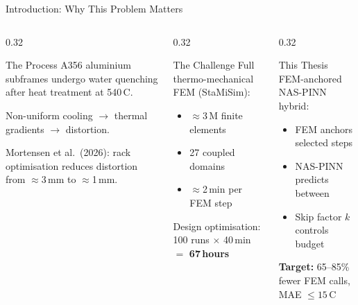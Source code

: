 \documentclass[aspectratio=169, 11pt]{beamer}
\begin{document}
\begin{frame}{Introduction: Why This Problem Matters}
  \begin{columns}[t]
    \begin{column}{0.32\textwidth}
      \begin{block}{The Process}
        \small
        A356 aluminium subframes undergo water quenching after heat
        treatment at 540\,\textdegree C.

        \smallskip
        Non-uniform cooling $\to$ thermal gradients $\to$ distortion.

        \smallskip
        Mortensen et al.\ (2026): rack optimisation reduces distortion
        from $\approx$3\,mm to $\approx$1\,mm.
      \end{block}
    \end{column}
    \begin{column}{0.32\textwidth}
      \begin{block}{The Challenge}
        \small
        Full thermo-mechanical FEM (StaMiSim):
        \begin{itemize}\itemsep1pt
          \item $\approx$3\,M finite elements
          \item 27 coupled domains
          \item $\approx$2\,min per FEM step
        \end{itemize}
        \smallskip
        Design optimisation:\\
        100 runs $\times$ 40\,min $=$ \textbf{67\,hours}
      \end{block}
    \end{column}
    \begin{column}{0.32\textwidth}
      \begin{block}{This Thesis}
        \small
        FEM-anchored NAS-PINN hybrid:
        \begin{itemize}\itemsep1pt
          \item FEM anchors selected steps
          \item NAS-PINN predicts between
          \item Skip factor $k$ controls budget
        \end{itemize}
        \smallskip
        \textbf{Target:} 65--85\% fewer FEM calls,
        MAE $\leq 15$\,\textdegree C
      \end{block}
    \end{column}
  \end{columns}
\end{frame}
\end{document}

